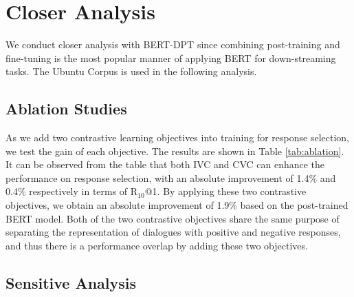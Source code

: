 \documentclass[letterpaper]{article} \usepackage{aaai22}  \usepackage{times}  \usepackage{helvet}  \usepackage{courier}  \usepackage[hyphens]{url}  \usepackage{graphicx} \urlstyle{rm} \def\UrlFont{\rm}  \usepackage{natbib}  \usepackage{caption} \DeclareCaptionStyle{ruled}{labelfont=normalfont,labelsep=colon,strut=off} \frenchspacing  \setlength{\pdfpagewidth}{8.5in}  \setlength{\pdfpageheight}{11in}  \usepackage{algorithm}
\begin{document}
\section{Closer Analysis}

We conduct closer analysis with BERT-DPT since combining post-training and fine-tuning is the most popular manner of applying BERT for down-streaming tasks. The Ubuntu Corpus is used in the following analysis.

\subsection{Ablation Studies}

\begin{table}[htbp]
\centering
{}
\caption{Ablation Analysis on the Ubuntu corpus.}
\label{tab:ablation}
\end{table}

As we add two contrastive learning objectives into training for response selection, we test the gain of each objective. The results are shown in Table \ref{tab:ablation}. It can be observed from the table that both IVC and CVC can enhance the performance on response selection, with an absolute improvement of 1.4\% and 0.4\% respectively in terms of R$_{10}$@1. By applying these two contrastive objectives, we obtain an absolute improvement of 1.9\% based on the post-trained BERT model. Both of the two contrastive objectives share the same purpose of separating the representation of dialogues with positive and negative responses, and thus there is a performance overlap by adding these two objectives. 

\subsection{Sensitive Analysis}
\end{document}
